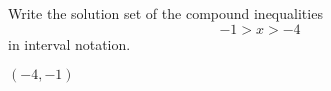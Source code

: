 

Write the solution set of the compound inequalities
\[-1> x >-4 \]
in interval notation.

\begin{solution}
$(-4, -1)$
\end{solution}